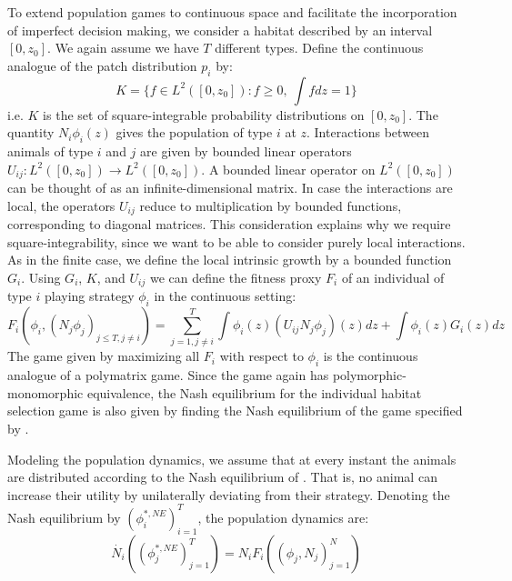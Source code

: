 To extend population games to continuous space and facilitate the incorporation of imperfect decision making, we consider a habitat described by an interval $[0,z_0]$. We again assume we have $T$ different types. Define the continuous analogue of the patch distribution $p_i$ by:
\begin{equation}
  K = \{ f \in L^2([0,z_0]) : f \geq 0,~\int f dz = 1\}
  \label{eq:space_of_dists}
\end{equation}
i.e. $K$ is the set of square-integrable probability distributions on $[0,z_0]$. The quantity $N_i \phi_i(z)$ gives the population of type $i$ at $z$. Interactions between animals of type $i$ and $j$ are given by bounded linear operators $U_{ij}: L^2([0,z_0]) \to L^2([0,z_0])$. A bounded linear operator on $L^2([0,z_0])$ can be thought of as an infinite-dimensional matrix. In case the interactions are local, the operators $U_{ij}$ reduce to multiplication by bounded functions, corresponding to diagonal matrices. This consideration explains why we require square-integrability, since we want to be able to consider purely local interactions. As in the finite case, we define the local intrinsic growth by a bounded function $G_i$. Using $G_i$, $K$, and $U_{ij}$ we can define the fitness proxy $F_i$ of an individual of type $i$ playing strategy $\phi_i$ in the continuous setting:
\begin{equation}
  F_i(\phi_i, (N_j \phi_j)_{j \leq T, j \neq i}) = \sum_{j=1,j\neq i}^T \int \phi_i(z) (U_{ij}N_j \phi_j)(z) dz + \int \phi_i(z) G_i(z) dz %
  \label{eq:utility}
\end{equation}
The game given by maximizing all $F_i$ with respect to $\phi_i$ is the continuous analogue of a polymatrix game. Since the game again has polymorphic-monomorphic equivalence, the Nash equilibrium for the individual habitat selection game is also given by finding the Nash equilibrium of the game specified by .

Modeling the population dynamics, we assume that at every instant the animals are distributed according to the Nash equilibrium of . That is, no animal can increase their utility by unilaterally deviating from their strategy. Denoting the Nash equilibrium by $(\phi_i^{*,NE})^T_{i=1}$, the population dynamics are:
\begin{equation}
  \dot{N_i}((\phi_j^{*,NE})_{j=1}^T ) = N_i F_i((\phi_j, N_j)_{j=1}^N)
\end{equation}

